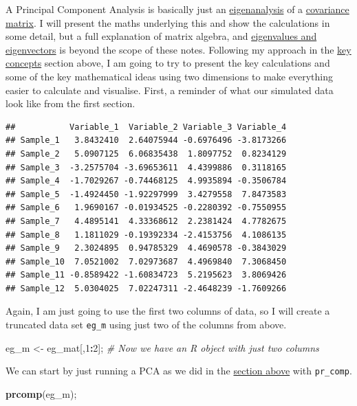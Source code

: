 \documentclass[]{article}
\newenvironment{Shaded}{\begin{snugshade}}{\end{snugshade}}
\newcommand{\CommentTok}[1]{\textcolor[rgb]{0.56,0.35,0.01}{\textit{#1}}}
\newcommand{\DecValTok}[1]{\textcolor[rgb]{0.00,0.00,0.81}{#1}}
\newcommand{\KeywordTok}[1]{\textcolor[rgb]{0.13,0.29,0.53}{\textbf{#1}}}
\newcommand{\NormalTok}[1]{#1}
\newcommand{\OperatorTok}[1]{\textcolor[rgb]{0.81,0.36,0.00}{\textbf{#1}}}
\newcommand{\StringTok}[1]{\textcolor[rgb]{0.31,0.60,0.02}{#1}}
\begin{document}
A Principal Component Analysis is basically just an
\href{https://en.wikipedia.org/wiki/Eigenvalues_and_eigenvectors}{eigenanalysis}
of a \href{https://en.wikipedia.org/wiki/Covariance_matrix}{covariance
matrix}. I will present the maths underlying this and show the
calculations in some detail, but a full explanation of matrix algebra,
and
\href{https://en.wikipedia.org/wiki/Eigenvalues_and_eigenvectors}{eigenvalues
and eigenvectors} is beyond the scope of these notes. Following my
approach in the \protect\hyperlink{pca}{key concepts} section above, I
am going to try to present the key calculations and some of the key
mathematical ideas using two dimensions to make everything easier to
calculate and visualise. First, a reminder of what our simulated data
look like from the first section.

\begin{verbatim}
##           Variable_1  Variable_2 Variable_3 Variable_4
## Sample_1   3.8432410  2.64075944 -0.6976496 -3.8173266
## Sample_2   5.0907125  6.06835438  1.8097752  0.8234129
## Sample_3  -3.2575704 -3.69653611  4.4399886  0.3118165
## Sample_4  -1.7029267 -0.74468125  4.9935894 -0.3506784
## Sample_5  -1.4924450 -1.92297999  3.4279558  7.8473583
## Sample_6   1.9690167 -0.01934525 -0.2280392 -0.7550955
## Sample_7   4.4895141  4.33368612  2.2381424  4.7782675
## Sample_8   1.1811029 -0.19392334 -2.4153756  4.1086135
## Sample_9   2.3024895  0.94785329  4.4690578 -0.3843029
## Sample_10  7.0521002  7.02973687  4.4969840  7.3068450
## Sample_11 -0.8589422 -1.60834723  5.2195623  3.8069426
## Sample_12  5.0304025  7.02247311 -2.4648239 -1.7609266
\end{verbatim}

Again, I am just going to use the first two columns of data, so I will
create a truncated data set \texttt{eg\_m} using just two of the columns
from above.

\begin{Shaded}
\begin{Highlighting}[]
\NormalTok{eg_m <-}\StringTok{ }\NormalTok{eg_mat[,}\DecValTok{1}\OperatorTok{:}\DecValTok{2}\NormalTok{]; }\CommentTok{# Now we have an R object with just two columns}
\end{Highlighting}
\end{Shaded}

We can start by just running a PCA as we did in the
\protect\hyperlink{Rcode}{section above} with \texttt{pr\_comp}.

\begin{Shaded}
\begin{Highlighting}[]
\KeywordTok{prcomp}\NormalTok{(eg_m);}
\end{Highlighting}
\end{Shaded}
\end{document}
